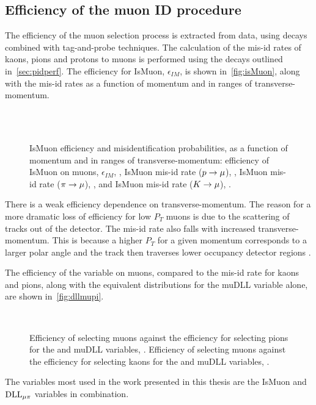\subsection{Efficiency of the muon ID procedure}
The efficiency of the muon selection process is extracted from data, using \jpsi\to\mup\mun decays combined with tag-and-probe techniques. The calculation of the mis-id rates of kaons, pions and protons to muons is performed using the decays outlined in~\autoref{sec:pidperf}. The efficiency for IsMuon, $\epsilon_{IM}$, is shown in~\autoref{fig:isMuon}, along with the mis-id rates as a function of momentum and in ranges of transverse-momentum.


\begin{figure}
  \centering
  \\
  \\      
  \caption{
 IsMuon efficiency and misidentification probabilities, as a function of momentum and in ranges of transverse-momentum: efficiency of IsMuon on muons, $\epsilon_{IM}$, \protect{}, IsMuon mis-id rate (${p}\rightarrow\mu$), \protect{}, IsMuon mis-id rate (${\pi}\rightarrow\mu$), \protect{}, and IsMuon mis-id rate (${K}\rightarrow\mu$), \protect{} \cite{muonID}.
  }
  \label{fig:isMuon}
\end{figure}

There is a weak efficiency dependence on transverse-momentum. The reason for a more dramatic loss of efficiency for low $P_{T}$ muons is due to the scattering of tracks out of the detector. The mis-id rate also falls with increased transverse-momentum. This is because a higher $P_{T}$ for a given momentum corresponds to a larger polar angle and the track then traverses lower occupancy detector regions \cite{muonID}.

The efficiency of the \dllmupi variable on muons, compared to the mis-id rate for kaons and pions, along with the equivalent distributions for the muDLL variable alone, are shown in~\autoref{fig:dllmupi}.
\begin{figure}[!h]
  \centering
                 \\
        \caption{Efficiency of selecting muons against the efficiency for selecting pions for the \dllmupi and muDLL variables, \protect{}. Efficiency of selecting muons against the efficiency for selecting kaons for the \dllmupi and muDLL variables, \protect{}.
  }
  \label{fig:dllmupi}
\end{figure}
The variables most used in the work presented in this thesis are the IsMuon and $\mathrm{DLL}_{{\mu}\pi}$ variables in combination. 

